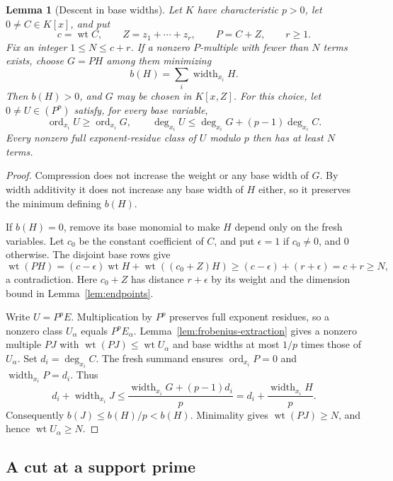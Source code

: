 \documentclass[11pt]{article}
\DeclareMathOperator{\wt}{wt}\DeclareMathOperator{\ord}{ord}
\numberwithin{equation}{section}
\newtheorem{lemma}[theorem]{Lemma}
\theoremstyle{definition}\newtheorem{definition}[theorem]{Definition}
\theoremstyle{remark}\newtheorem{remark}[theorem]{Remark}
\begin{document}
\begin{lemma}[Descent in base widths]\label{lem:width-descent}
Let $K$ have characteristic $p>0$, let $0\ne C\in K[x]$, and put
\[
 c=\wt C,\qquad Z=z_1+\cdots+z_r,\qquad P=C+Z,\qquad r\ge1.
\]
Fix an integer $1\le N\le c+r$. If a nonzero $P$-multiple with fewer than $N$
terms exists, choose $G=PH$ among them minimizing
\[
 b(H)=\sum_i\operatorname{width}_{x_i}H.
\]
Then $b(H)>0$, and $G$ may be chosen in $K[x,Z]$.
For this choice, let $0\ne U\in(P^p)$ satisfy, for every base variable,
\begin{equation}\label{eq:descent-exponent-bounds}
 \operatorname{ord}_{x_i}U\ge\operatorname{ord}_{x_i}G,
 \qquad
 \deg_{x_i}U\le\deg_{x_i}G+(p-1)\deg_{x_i}C.
\end{equation}
Every nonzero full exponent-residue class of $U$ modulo $p$ then
has at least $N$ terms.
\end{lemma}
\begin{proof}
Compression does not increase the weight or any base width of $G$.
By width additivity it does not increase any base width of $H$
either, so it preserves the minimum defining $b(H)$.

If $b(H)=0$, remove its base monomial to make $H$ depend only on
the fresh variables. Let $c_0$ be the constant coefficient of $C$,
and put $\epsilon=1$ if $c_0\ne0$, and $0$ otherwise. The disjoint
base rows give
\[
 \wt(PH)=(c-\epsilon)\wt H+\wt((c_0+Z)H)
 \ge(c-\epsilon)+(r+\epsilon)=c+r\ge N,
\]
a contradiction. Here $c_0+Z$ has distance $r+\epsilon$ by its
weight and the dimension bound in Lemma~\ref{lem:endpoints}.

Write $U=P^pE$. Multiplication by $P^p$ preserves full exponent
residues, so a nonzero class $U_\alpha$ equals $P^pE_\alpha$.
Lemma~\ref{lem:frobenius-extraction} gives a nonzero multiple $PJ$
with $\wt(PJ)\le\wt U_\alpha$ and base widths at most $1/p$ times
those of $U_\alpha$. Set $d_i=\deg_{x_i}C$. The fresh summand
ensures $\operatorname{ord}_{x_i}P=0$ and
$\operatorname{width}_{x_i}P=d_i$. Thus
\[
 d_i+\operatorname{width}_{x_i}J
 \le\frac{\operatorname{width}_{x_i}G+(p-1)d_i}{p}
 =d_i+\frac{\operatorname{width}_{x_i}H}{p}.
\]
Consequently $b(J)\le b(H)/p<b(H)$. Minimality gives
$\wt(PJ)\ge N$, and hence $\wt U_\alpha\ge N$.
\end{proof}

\subsection{A cut at a support prime}
\end{document}
